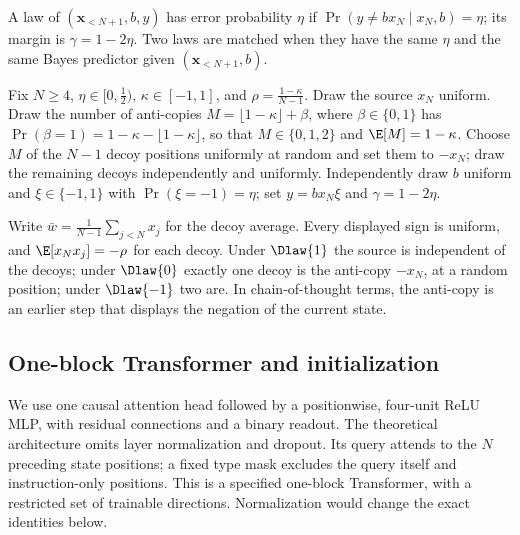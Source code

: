 \begin{definition}
\label{def:law}
A law of $(\bm x_{<N+1},b,y)$ has error probability $\eta$ if
$\Pr(y\ne b x_N\mid x_N,b)=\eta$; its margin is $\gamma=1-2\eta$.
Two laws are matched when they have the same $\eta$ and the same Bayes predictor given $(\bm x_{<N+1},b)$.
\end{definition}

\begin{definition}
\label{def:Dkappa}
Fix $N\ge4$, $\eta\in[0,\tfrac{1}{2})$, $\kappa\in[-1,1]$, and $\rho=\tfrac{1-\kappa}{N-1}$.
Draw the source $x_N$ uniform. Draw the number of anti-copies $M=\lfloor1-\kappa\rfloor+\beta$, where
$\beta\in\{0,1\}$ has $\Pr(\beta=1)=1-\kappa-\lfloor1-\kappa\rfloor$, so that $M\in\{0,1,2\}$ and $\E[M]=1-\kappa$.
Choose $M$ of the $N-1$ decoy positions uniformly at random and set them to $-x_N$; draw the remaining decoys independently and uniformly.
Independently draw $b$ uniform and $\xi\in\{-1,1\}$ with $\Pr(\xi=-1)=\eta$;
set $y=b x_N \xi$ and $\gamma=1-2\eta$.
\end{definition}
Write $\bar w=\tfrac{1}{N-1}\sum_{j<N}x_j$ for the decoy average.
Every displayed sign is uniform, and $\E[x_N x_j]=-\rho$ for each decoy.
Under $\Dlaw{1}$ the source is independent of the decoys; under $\Dlaw{0}$ exactly one decoy is the anti-copy $-x_N$, at a random position;
under $\Dlaw{-1}$ two are. In chain-of-thought terms, the anti-copy is an earlier step that displays the negation of the current state.

\subsection{One-block Transformer and initialization}
\label{sec:architecture}
We use one causal attention head followed by a positionwise, four-unit ReLU MLP, with residual connections and a binary readout.
The theoretical architecture omits layer normalization and dropout. Its query attends to the $N$ preceding state positions;
a fixed type mask excludes the query itself and instruction-only positions. This is a specified one-block Transformer,
with a restricted set of trainable directions. Normalization would change the exact identities below.

